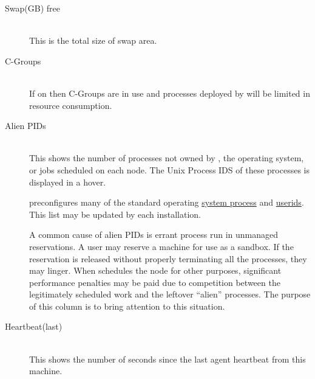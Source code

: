 \begin{description}
      \item[Swap(GB) free] \hfill \\
        This is the total size of swap area.  


      \item[C-Groups] \hfill \\
        If on then C-Groups are in use and processes deployed by {\DUCC} will
        be limited in resource consumption.


      \item[Alien PIDs] \hfill \\
        This shows the number of processes not owned by {\DUCC}, the operating system, or
        jobs scheduled on each node.  The Unix Process IDS of these processes is displayed
        in a hover.

        {\DUCC} preconfigures many of the standard operating 
        \hyperref[itm:props-rogue.process]{system process} and 
        \hyperref[itm:props-rogue.user]{userids}.  This list may be updated by each
        installation.

        A common cause of alien PIDs is errant process run in unmanaged reservations.  A
        user may reserve a machine for use as a sandbox.  If the reservation is released
        without properly terminating all the processes, they may linger.  When {\DUCC} 
        schedules the node for other purposes, significant performance penalties may be
        paid due to competition between the legitimately scheduled work and the leftover
        ``alien'' processes.  The purpose of this column is to bring attention to this situation.


      \item[Heartbeat(last)] \hfill \\
        This shows the number of seconds since the last agent heartbeat from this machine.

      \end{description}
      
